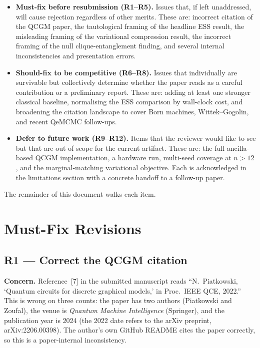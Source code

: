 \documentclass[conference,10pt]{IEEEtran}
\begin{document}
\begin{itemize}[leftmargin=*]
    \item \textbf{Must-fix before resubmission (R1--R5).} Issues that, if
    left unaddressed, will cause rejection regardless of other merits.
    These are: incorrect citation of the QCGM paper, the tautological
    framing of the headline ESS result, the misleading framing of the
    variational compression result, the incorrect framing of the null
    clique-entanglement finding, and several internal inconsistencies and
    presentation errors.
    \item \textbf{Should-fix to be competitive (R6--R8).} Issues that
    individually are survivable but collectively determine whether the
    paper reads as a careful contribution or a preliminary report. These
    are: adding at least one stronger classical baseline, normalising the
    ESS comparison by wall-clock cost, and broadening the citation
    landscape to cover Born machines, Wittek--Gogolin, and recent
    QeMCMC follow-ups.
    \item \textbf{Defer to future work (R9--R12).} Items that the reviewer
    would like to see but that are out of scope for the current artifact.
    These are: the full ancilla-based QCGM implementation, a hardware run,
    multi-seed coverage at $n > 12$, and the marginal-matching variational
    objective. Each is acknowledged in the limitations section with a
    concrete handoff to a follow-up paper.
\end{itemize}

The remainder of this document walks each item.

\section{Must-Fix Revisions}

\subsection{R1 --- Correct the QCGM citation}

\textbf{Concern.} Reference~[7] in the submitted manuscript reads
``N.~Piatkowski, `Quantum circuits for discrete graphical models,' in
Proc.~IEEE QCE, 2022.'' This is wrong on three counts: the paper has two
authors (Piatkowski and Zoufal), the venue is \emph{Quantum Machine
Intelligence} (Springer), and the publication year is 2024 (the 2022
date refers to the arXiv preprint, arXiv:2206.00398). The author's own
GitHub README cites the paper correctly, so this is a paper-internal
inconsistency.
\end{document}
